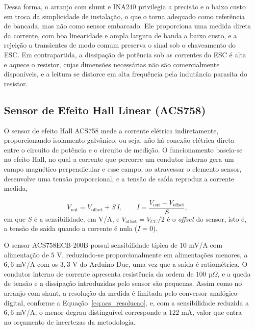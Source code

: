 Dessa forma, o arranjo com shunt e INA240 privilegia a precisão e o baixo custo em troca
da simplicidade de instalação, o que o torna adequado como referência de bancada, mas não
como sensor embarcado. Ele proporciona uma medida direta da corrente, com boa linearidade e
ampla largura de banda a baixo custo, e a rejeição a transientes de modo comum preserva o
sinal sob o chaveamento do ESC. Em contrapartida, a dissipação de potência sob as correntes
do ESC é alta e aquece o resistor, cujas dimensões necessárias não são comercialmente
disponíveis, e a leitura se distorce em alta frequência pela indutância parasita do
resistor.

\subsection{Sensor de Efeito Hall Linear (ACS758)}
\label{sec:acshall}

O sensor de efeito Hall ACS758 mede a corrente elétrica indiretamente, proporcionando isolamento 
galvânico, ou seja, não há conexão elétrica direta entre o circuito de potência e o circuito de medição. 
O funcionamento baseia-se no efeito Hall, no qual a corrente que percorre um condutor
interno gera um campo magnético perpendicular e esse campo, ao atravessar o elemento
sensor, desenvolve uma tensão proporcional, e a tensão de saída reproduz a
corrente medida,

\begin{equation*}
V_\mathrm{out} = V_{\mathrm{offset}} + S\,I,
\qquad
I = \frac{V_\mathrm{out} - V_{\mathrm{offset}}}{S},
\end{equation*}
em que $S$ é a sensibilidade, em V/A, e $V_{\mathrm{offset}} = V_{CC}/2$ é o \emph{offset} do
sensor, isto é, a tensão de saída quando a corrente é nula ($I = 0$).

O sensor ACS758ECB-200B possui sensibilidade típica de $10$ mV/A com alimentação de
$5$ V, reduzindo-se proporcionalmente em alimentações menores, a $6{,}6$ mV/A com os
$3{,}3$ V do Arduino Due, uma vez que a saída é ratiométrica.
O condutor interno de corrente apresenta resistência da ordem de $100$ µ$\Omega$, e a
queda de tensão e a dissipação introduzidas pelo sensor são pequenas. Assim como no
arranjo com shunt, a resolução da medida é limitada pelo conversor analógico-digital, conforme
a Equação~\eqref{eq:acs_resolucao}, e, com a sensibilidade reduzida a $6{,}6$ mV/A, o menor
degrau distinguível corresponde a $122$ mA, valor que entra no orçamento de incertezas da
metodologia.

